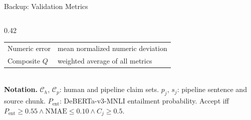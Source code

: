 \documentclass[aspectratio=169, 11pt]{beamer}
\begin{document}
\begin{frame}{Backup: Validation Metrics}
\begin{columns}[T]
\begin{column}{0.42\textwidth}
\begin{tabular}{@{}p{2.2cm}p{3.8cm}@{}}
    Numeric error     & mean normalized numeric deviation\\[2pt]
    Composite $Q$     & weighted average of all metrics\\
    \bottomrule
    \end{tabular}\\[6pt]
    {\tiny\color{ornlgrey}
    \textbf{Notation.} $\mathcal{C}_h$, $\mathcal{C}_p$: human and pipeline claim sets. $p_j$, $s_j$: pipeline sentence and source chunk. $P_{\text{ent}}$: DeBERTa-v3-MNLI entailment probability. Accept iff $P_{\text{ent}}{\geq}0.55 \wedge \text{NMAE}{\leq}0.10 \wedge C_j{\geq}0.5$.
    }
  \end{column}
\end{columns}
\end{frame}
\end{document}
